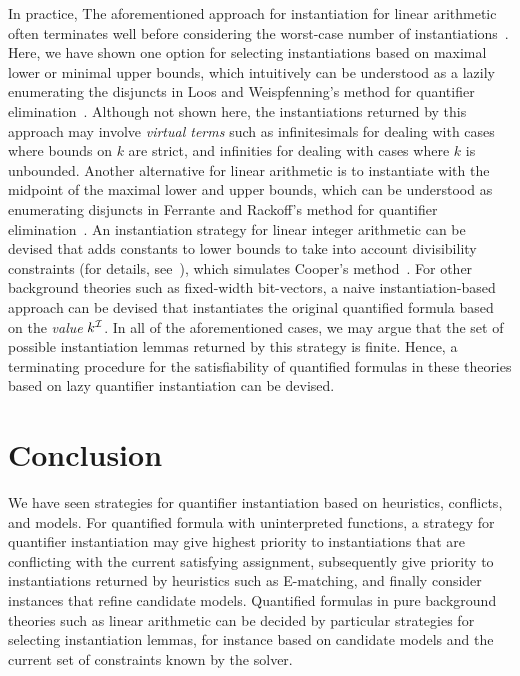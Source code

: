 \documentclass[oribibl]{llncs}
\begin{document}
In practice,
The aforementioned approach for instantiation for linear arithmetic often terminates well before considering the worst-case number of instantiations~\cite{DBLP:conf/lpar/BjornerJ15,InstLA2016}.
Here, we have shown one option for selecting instantiations based on maximal lower or minimal upper bounds,
which intuitively can be understood as a lazily enumerating the disjuncts in Loos and Weispfenning's method for quantifier elimination~\cite{Loos93applyinglinear}.
Although not shown here, the instantiations returned by this approach may involve \emph{virtual terms} such as infinitesimals for dealing with cases where bounds on $k$ are strict,
and infinities for dealing with cases where $k$ is unbounded.
Another alternative for linear arithmetic is to instantiate with the midpoint of the
maximal lower and upper bounds,
which can be understood as enumerating disjuncts in Ferrante and Rackoff's method for quantifier elimination~\cite{FerranteRackoff79ComputationalComplexityLogicalTheories}.
An instantiation strategy for linear integer arithmetic can be devised that adds constants to lower bounds to take into account divisibility constraints (for details, see~\cite{InstLA2016}),
which simulates Cooper's method~\cite{cooper1972}.
For other background theories such as fixed-width bit-vectors, 
a naive instantiation-based approach can be devised that instantiates the original quantified formula based on the \emph{value} $k^{\mathcal{I}}$.
In all of the aforementioned cases, we may argue that the set of possible instantiation lemmas returned by this strategy is finite.
Hence, a terminating procedure for the satisfiability of quantified formulas in these theories based on lazy quantifier instantiation can be devised.


\section{Conclusion}
\label{sec:conclusion}

We have seen strategies for quantifier instantiation
based on heuristics, conflicts, and models.
For quantified formula with uninterpreted functions,
a strategy for quantifier instantiation may give highest priority to instantiations that
are conflicting with the current satisfying assignment,
subsequently give priority to instantiations returned by heuristics such as E-matching,
and finally consider instances that refine candidate models.
Quantified formulas in pure background theories such as linear arithmetic can be 
decided by particular strategies for selecting instantiation lemmas, for instance
based on candidate models and the current set of constraints known by the solver.
\end{document}
